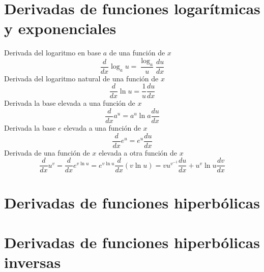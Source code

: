\section{Derivadas de funciones logarítmicas y exponenciales}
Derivada del logaritmo en base $a$ de una función de $x$
\begin{equation}
	\frac{d}{dx}\log_a u=\frac{\log_a}{u}\frac{du}{dx} 
\end{equation}
Derivada del logaritmo natural de una función de $x$
\begin{equation}
	\frac{d}{dx}\ln u=\frac{1}{u}\frac{du}{dx} 
\end{equation}
Derivada la base elevada a una función de $x$
\begin{equation}
	\frac{d}{dx}a^u=a^u \ln a \frac{du}{dx} 
\end{equation}
Derivada la base $e$ elevada a una función de $x$
\begin{equation}
	\frac{d}{dx}e^u=e^u \frac{du}{dx} 
\end{equation}
Derivada de una función de $x$ elevada a otra función de $x$
\begin{equation}
	\frac{d}{dx}u^v=\frac{d}{dx}e^{v \ln u}=e^{v \ln u} \frac{d}{dx}(v \ln u)=vu^{v^{-1}}\frac{du}{dx}+u^v \ln u \frac{dv}{dx} 
\end{equation}
\section{Derivadas de funciones hiperbólicas}

\section{Derivadas de funciones hiperbólicas inversas}